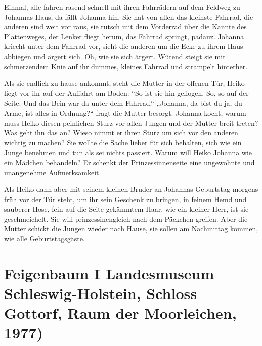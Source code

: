 Einmal, alle fahren rasend schnell mit ihren Fahrrädern auf dem Feldweg zu Johannas Haus, da fällt Johanna hin. Sie hat von allen das kleinste Fahrrad, die anderen sind weit vor raus, sie rutsch mit dem Vorderrad über die Kannte des Plattenweges, der Lenker fliegt herum, das Fahrrad springt, padauz. Johanna kriecht unter dem Fahrrad vor, sieht die anderen um die Ecke zu ihrem Haus abbiegen und ärgert sich. Oh, wie sie sich ärgert. Wütend steigt sie mit schmerzendem Knie auf ihr dummes, kleines Fahrrad und strampelt hinterher.

Als sie endlich zu hause ankommt, steht die Mutter in der offenen Tür, Heiko liegt vor ihr auf der Auffahrt am Boden: “So ist sie hin geflogen. So, so auf der Seite. Und das Bein war da unter dem Fahrrad.“ „Johanna, da bist du ja, du Arme, ist alles in Ordnung?“ fragt die Mutter besorgt.
 Johanna kocht, warum muss Heiko diesen peinlichen Sturz vor allen Jungen und der Mutter breit treten? Was geht ihn das an? Wieso nimmt er ihren Sturz um sich vor den anderen wichtig zu machen? Sie wollte die Sache lieber für sich behalten, sich wie ein Junge benehmen und tun als sei nichts passiert. Warum will Heiko Johanna wie ein Mädchen behandeln? Er schenkt der Prinzessinnenseite eine ungewohnte und unangenehme Aufmerksamkeit.
 
Als Heiko dann aber mit seinem kleinen Bruder an Johannas Geburtstag morgens früh vor der Tür steht, um ihr sein Geschenk zu bringen, in feinem Hemd und sauberer Hose, fein auf die Seite gekämmtem Haar, wie ein kleiner Herr, ist sie geschmeichelt. Sie will prinzessinengleich nach dem Päckchen greifen.  Aber die Mutter schickt die Jungen wieder nach Hause, sie sollen am Nachmittag kommen, wie alle Geburtstagsgäste.



\section*{Feigenbaum I 
Landesmuseum Schleswig-Holstein, Schloss Gottorf, Raum der Moorleichen, 1977)}



